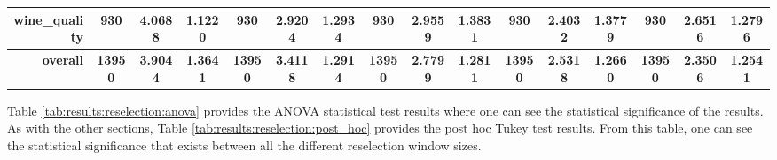 \begin{table}[htbp]
{\begin{tabular}{rccccccccccccccc}
                  wine\_quality                       & 930                                      & 4.0688                                                                    & 1.1220          & 930                            & 2.9204          & 1.2934          & 930                             & 2.9559          & 1.3831          & 930                             & \cellcolor[rgb]{ .776,  .937,  .808}\textcolor[rgb]{ 0,  .38,  0}{2.4032} & 1.3779          & 930                             & 2.6516                                                                             & 1.2796          \\
                  \midrule
                  \textbf{overall}                    & \textbf{13950}                           & \textbf{3.9044}                                                           & \textbf{1.3641} & \textbf{13950}                 & \textbf{3.4118} & \textbf{1.2914} & \textbf{13950}                  & \textbf{2.7799} & \textbf{1.2811} & \textbf{13950}                  & \textbf{2.5318}                                                           & \textbf{1.2660} & \textbf{13950}                  & \cellcolor[rgb]{ .776,  .937,  .808}\textcolor[rgb]{ 0,  .38,  0}{\textbf{2.3506}} & \textbf{1.2541} \\
            \end{tabular}%
      }
\end{table}%

Table \ref{tab:results:reselection:anova} provides the ANOVA statistical test results where one can see the statistical significance of the results. As with the other sections, Table \ref{tab:results:reselection:post_hoc} provides the post hoc Tukey test results. From this table, one can see the statistical significance that exists between all the different reselection window sizes.

